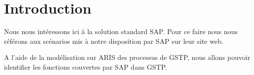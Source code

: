 \section{Introduction}

Nous nous intéressons ici à la solution standard SAP. Pour ce faire nous nous 
référons aux scénarios mis à notre disposition par SAP sur leur site web.

A l'aide de la modélisation sur ARIS des processus de GSTP, nous allons pouvoir 
identifier les fonctions couvertes par SAP dans GSTP.
